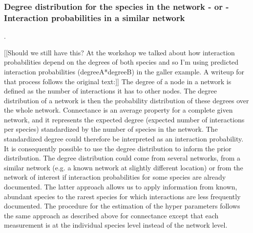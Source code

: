 ﻿\documentclass[12pt]{article}
\begin{document}


      \subsubsection*{Degree distribution for the species in the network - or - Interaction probabilities in a similar network}.

          [[Should we still have this? At the workshop we talked about how interaction probabilities depend on the degrees of both species and so I'm using predicted interaction probabilities (degreeA*degreeB) in the galler example. A writeup for that process follows the original text:]]
          The degree of a node in a network is defined as the number of interactions it has to other nodes. The degree distribution of a network is then the probability distribution of these degrees over the whole network. Connectance is an average property for a complete given network, and it represents the expected degree (expected number of interactions per species) standardized by the number of species in the network. The standardized degree could therefore be interpreted as an interaction probability. It is consequently possible to use the degree distribution to inform the prior distribution. The degree distribution could come from several networks, from a similar network (e.g. a known network at slightly different location) or from the network of interest if interaction probabilities for some species are already documented. The latter approach allows us to apply information from known, abundant species to the rarest species for which interactions are less frequently documented. The procedure for the estimation of the hyper parameters follows the same approach as described above for connectance except that each measurement is at the individual species level instead of the network level.
\end{document}
